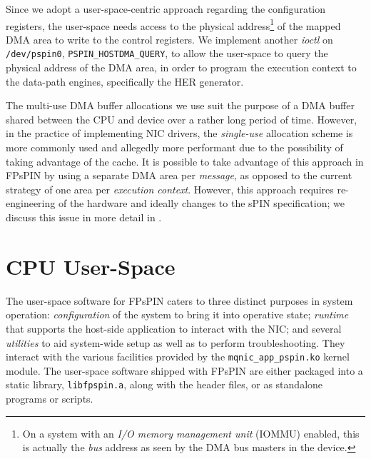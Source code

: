 Since we adopt a user-space-centric approach regarding the configuration registers, the user-space needs access to the physical address\footnote{On a system with an \emph{I/O memory management unit} (IOMMU) enabled, this is actually the \emph{bus} address as seen by the DMA bus masters in the device.} of the mapped DMA area to write to the control registers.  We implement another \emph{ioctl} on \texttt{/dev/pspin0}, \texttt{PSPIN\_\-HOSTDMA\_\-QUERY}, to allow the user-space to query the physical address of the DMA area, in order to program the execution context to the data-path engines, specifically the HER generator.

The multi-use DMA buffer allocations we use suit the purpose of a DMA buffer shared between the CPU and device over a rather long period of time.  However, in the practice of implementing NIC drivers, the \emph{single-use} allocation scheme is more commonly used and allegedly more performant due to the possibility of taking advantage of the cache.  It is possible to take advantage of this approach in FPsPIN by using a separate DMA area per \emph{message}, as opposed to the current strategy of one area per \emph{execution context}.  However, this approach requires re-engineering of the hardware and ideally changes to the sPIN specification; we discuss this issue in more detail in .

\section{CPU User-Space} \label{sec:sw-lib}

The user-space software for FPsPIN caters to three distinct purposes in system operation: \emph{configuration} of the system to bring it into operative state; \emph{runtime} that supports the host-side application to interact with the NIC; and several \emph{utilities} to aid system-wide setup as well as to perform troubleshooting.  They interact with the various facilities provided by the \texttt{mqnic\_\-app\_\-pspin.ko} kernel module.  The user-space software shipped with FPsPIN are either packaged into a static library, \texttt{libfpspin.a}, along with the header files, or as standalone programs or scripts.

